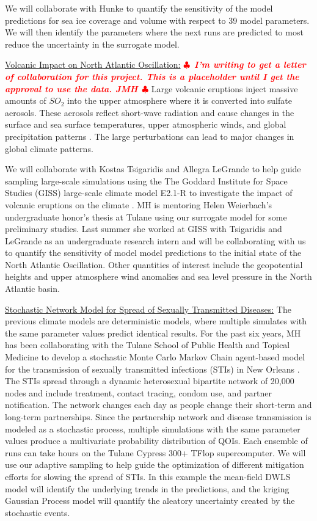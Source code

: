 \documentclass[11pt]{NSFamsart}
\newif\ifnotesw \noteswtrue
\newcommand{\notes}[1]{\ifnotesw \textcolor{red}{  $\clubsuit$\ {\sf \bf \it  #1}\ $\clubsuit$  }\fi}
\begin{document}
We will collaborate with Hunke to quantify the sensitivity of the model predictions for sea ice coverage and volume with respect to 39 model parameters.  We will then identify the parameters where the next runs are predicted to most reduce the uncertainty in the surrogate model.
    
  
\underline{Volcanic Impact on North Atlantic Oscillation:}\notes{I'm writing to get a letter of collaboration for this project. This is a placeholder until I get the approval to use the data. JMH}
Large volcanic eruptions inject massive amounts of ${SO_2}$ into the upper atmosphere where it is converted into sulfate aerosols.  These aerosols reflect short-wave radiation and cause changes in the surface and sea surface temperatures, upper atmospheric winds, and  global precipitation patterns \cite{zanchettin2013background, legrande2015volcanic}.  The large perturbations can lead to  major changes in global climate patterns.

We will collaborate with Kostas Tsigaridis and Allegra LeGrande to help guide sampling large-scale simulations using the The Goddard Institute for Space Studies (GISS) large-scale climate model E2.1-R to investigate the impact of volcanic eruptions on the climate
\cite{zanchettin2016model}.  MH is mentoring Helen Weierbach's undergraduate honor's thesis at Tulane using our surrogate model for some preliminary studies.  Last summer she worked at GISS with Tsigaridis and LeGrande as an undergraduate research intern and will be collaborating with us to quantify the sensitivity of model model predictions to the initial state of the North Atlantic Oscillation. Other quantities of interest include the geopotential heights and upper atmosphere wind anomalies and sea level pressure in the North Atlantic basin. 

\underline{Stochastic Network Model for Spread of Sexually Transmitted Diseases:}  The previous climate models are deterministic models, where multiple simulates with the same parameter values predict identical results.  For the past six years, MH has been collaborating with the Tulane School of Public Health and Topical Medicine to develop a stochastic Monte Carlo Markov Chain agent-based model for the transmission of sexually transmitted infections (STIs) in New Orleans \cite{}.  
The STIs spread through a dynamic heterosexual bipartite network of 20,000 nodes and include treatment, contact tracing, condom use, and partner notification. The network changes each day as people change their short-term and long-term partnerships.  
Since the partnership network and disease transmission is modeled as a stochastic process, multiple simulations with the same parameter values produce a multivariate probability distribution of QOIs.  Each ensemble of runs can take hours on the Tulane Cypress 300+ TFlop supercomputer. 
We will use our adaptive sampling to help guide the optimization of different mitigation efforts for slowing the spread of STIs.  
In this example the mean-field DWLS model will identify the underlying trends in the predictions, and the kriging Gaussian Process model will quantify the aleatory uncertainty created by the stochastic events.
\end{document}
